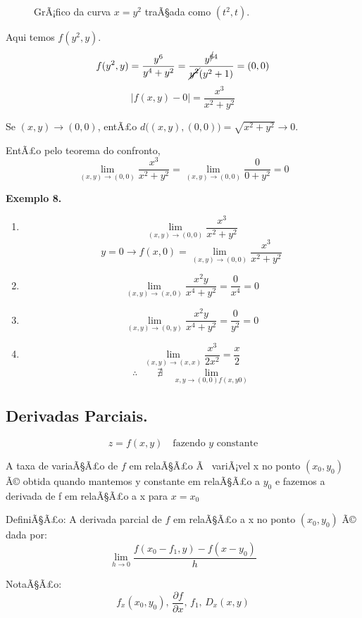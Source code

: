 \begin{figure}[H]
\centering
{}
\caption{GrÃ¡fico da curva $x = y^2$ traÃ§ada como $(t^2,t)$.}
\label{fig:xy2}
\end{figure}
Aqui temos $f(y^2,y)$.
\[f(y^2,y)=\frac{y^6}{y^4+y^2}=\frac{y^{\cancel{6}4}}{\cancel{y^2}(y^2+1)}=(0,0)\]
\[|f(x,y)-0|=\frac{x^3}{x^2+y^2}\]

Se $(x,y)\to(0,0)$, entÃ£o $d\big((x,y),(0,0)\big)=\sqrt{x^2+y^2}\to 0$.

EntÃ£o pelo teorema do confronto,
\[\lim_{(x,y)\to(0,0)}\frac{x^3}{x^2+y^2}=\lim_{(x,y)\to(0,0)}\frac{0}{0+y^2}=0\]

\textbf{Exemplo 8.}
\begin{enumerate}
  \item \[\lim_{(x,y)\to(0,0)}\frac{x^3}{x^2+y^2}\]
\[y=0\to f(x,0)=\lim_{(x,y)\to(0,0)}\frac{x^3}{x^2+y^2}\]
  \item \[\lim_{(x,y)\to(x,0)}\frac{x^2y}{x^4+y^2}=\frac{0}{x^4}=0\]
  \item \[\lim_{(x,y)\to(0,y)}\frac{x^2y}{x^4+y^2}=\frac{0}{y^2}=0\]
  \item \[\lim_{(x,y)\to(x,x)}\frac{x^3}{2x^2}=\frac{x}{2}\]
\[ \therefore\qquad\nexists\quad\lim_{x,y\to(0,0)f(x,y0)} \]
\end{enumerate}
\newpage
\subsection{Derivadas Parciais.}
\[ z = f(x,y) \quad \text{fazendo $y$ constante} \]

A taxa de variaÃ§Ã£o de $f$ em relaÃ§Ã£o Ã  variÃ¡vel x no ponto $(x_0,y_0)$ Ã© 
obtida quando mantemos y constante em relaÃ§Ã£o a $y_0$ e fazemos a 
derivada de f em relaÃ§Ã£o a x para $x=x_0$

DefiniÃ§Ã£o: A derivada parcial de $f$ em relaÃ§Ã£o a x no ponto 
$(x_0,y_0)$ Ã© dada por:
\[ \lim_{h\to0}\frac{f(x_0-f_1, y)-f(x-y_0)}{h}\]

NotaÃ§Ã£o:
\[ f_x(x_0,y_0),\, \frac{\partial f}{\partial x},\, f_1,\, D_x(x,y) \]

